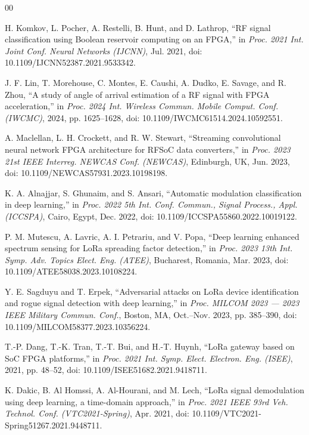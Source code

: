 \documentclass[conference]{IEEEtran}
\begin{document}
\begin{thebibliography}{00}

H. Komkov, L. Pocher, A. Restelli, B. Hunt, and D. Lathrop, ``RF signal classification using Boolean reservoir computing on an FPGA,'' in \textit{Proc. 2021 Int. Joint Conf. Neural Networks (IJCNN)}, Jul. 2021, doi: 10.1109/IJCNN52387.2021.9533342. %

J. F. Lin, T. Morehouse, C. Montes, E. Caushi, A. Dudko, E. Savage, and R. Zhou, ``A study of angle of arrival estimation of a RF signal with FPGA acceleration,'' in \textit{Proc. 2024 Int. Wireless Commun. Mobile Comput. Conf. (IWCMC)}, 2024, pp. 1625--1628, doi: 10.1109/IWCMC61514.2024.10592551. %

A. Maclellan, L. H. Crockett, and R. W. Stewart, ``Streaming convolutional neural network FPGA architecture for RFSoC data converters,'' in \textit{Proc. 2023 21st IEEE Interreg. NEWCAS Conf. (NEWCAS)}, Edinburgh, UK, Jun. 2023, doi: 10.1109/NEWCAS57931.2023.10198198. %

K. A. Alnajjar, S. Ghunaim, and S. Ansari, ``Automatic modulation classification in deep learning,'' in \textit{Proc. 2022 5th Int. Conf. Commun., Signal Process., Appl. (ICCSPA)}, Cairo, Egypt, Dec. 2022, doi: 10.1109/ICCSPA55860.2022.10019122. %

P. M. Mutescu, A. Lavric, A. I. Petrariu, and V. Popa, ``Deep learning enhanced spectrum sensing for LoRa spreading factor detection,'' in \textit{Proc. 2023 13th Int. Symp. Adv. Topics Elect. Eng. (ATEE)}, Bucharest, Romania, Mar. 2023, doi: 10.1109/ATEE58038.2023.10108224. %

Y. E. Sagduyu and T. Erpek, ``Adversarial attacks on LoRa device identification and rogue signal detection with deep learning,'' in \textit{Proc. MILCOM 2023 --- 2023 IEEE Military Commun. Conf.}, Boston, MA, Oct.--Nov. 2023, pp. 385--390, doi: 10.1109/MILCOM58377.2023.10356224. %

T.-P. Dang, T.-K. Tran, T.-T. Bui, and H.-T. Huynh, ``LoRa gateway based on SoC FPGA platforms,'' in \textit{Proc. 2021 Int. Symp. Elect. Electron. Eng. (ISEE)}, 2021, pp. 48--52, doi: 10.1109/ISEE51682.2021.9418711. %

K. Dakic, B. Al Homssi, A. Al-Hourani, and M. Lech, ``LoRa signal demodulation using deep learning, a time-domain approach,'' in \textit{Proc. 2021 IEEE 93rd Veh. Technol. Conf. (VTC2021-Spring)}, Apr. 2021, doi: 10.1109/VTC2021-Spring51267.2021.9448711. %


\end{thebibliography}
\end{document}
